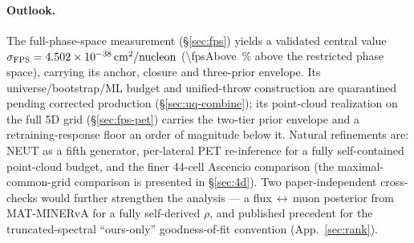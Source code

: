 \paragraph{Outlook.}
The full-phase-space measurement (\S\ref{sec:fps}) yields a validated
central value $\sigma_{\mathrm{FPS}}=\SI{4.502e-38}{cm^2/nucleon}$
(\SI{\fpsAbove}{\percent} above the restricted phase space), carrying its anchor,
closure and three-prior envelope. Its universe/bootstrap/ML budget and
unified-throw construction are quarantined pending corrected production
(\S\ref{sec:uq-combine}); its point-cloud
realization on the full 5D grid (\S\ref{sec:fps-pet}) carries the two-tier
prior envelope and a retraining-response floor an order of magnitude below
it. Natural
refinements are: NEUT as a fifth
generator, per-lateral PET re-inference for a fully self-contained point-cloud
budget, and the finer 44-cell Ascencio comparison (the maximal-common-grid
comparison is presented in \S\ref{sec:4d}). Two
paper-independent cross-checks would further strengthen the analysis --- a
flux\,$\leftrightarrow$\,muon
posterior from MAT-MINERvA for a fully self-derived $\rho$, and published
precedent for the truncated-spectral ``ours-only'' goodness-of-fit convention
(App.~\ref{sec:rank}).
